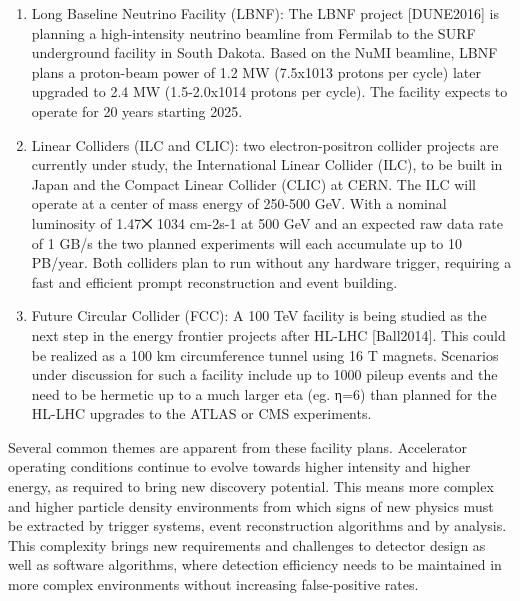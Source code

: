 \begin{enumerate}
\item
Long Baseline Neutrino Facility (LBNF): The LBNF project [DUNE2016] is planning a high-intensity neutrino beamline from Fermilab to the SURF underground facility in South Dakota. Based on the NuMI beamline, LBNF plans a proton-beam power of 1.2 MW (7.5x1013 protons per cycle) later upgraded to 2.4 MW (1.5-2.0x1014 protons per cycle). The facility expects to operate for 20 years starting 2025.
\item 
Linear Colliders (ILC and CLIC): two electron-positron collider projects are currently under study, the International Linear Collider (ILC), to be built in Japan and the Compact Linear Collider (CLIC) at CERN. The ILC will operate at a center of mass energy of 250-500 GeV. With a nominal luminosity of 1.47⨉ 1034 cm-2s-1 at 500 GeV and an expected raw data rate of 1 GB/s the two planned experiments will each accumulate up to 10 PB/year. Both colliders plan to run without any hardware trigger, requiring a fast and efficient prompt reconstruction and event building.
\item
Future Circular Collider (FCC): A 100 TeV facility is being studied as the next step in the energy frontier projects after HL-LHC [Ball2014]. This could be realized as a 100 km circumference tunnel using 16 T magnets. Scenarios under discussion for such a facility include up to 1000 pileup events and the need to be hermetic up to a much larger eta (eg. η=6) than planned for the HL-LHC upgrades to the ATLAS or CMS experiments. 
\end{enumerate}
Several common themes are apparent from these facility plans. Accelerator operating conditions continue to evolve towards higher intensity and higher energy, as required to bring new discovery potential. This means more complex and higher particle density environments from which signs of new physics must be extracted by trigger systems, event reconstruction algorithms and by analysis. This complexity brings new requirements and challenges to detector design as well as software algorithms, where detection efficiency needs to be maintained in more complex environments without increasing false-positive rates. 


